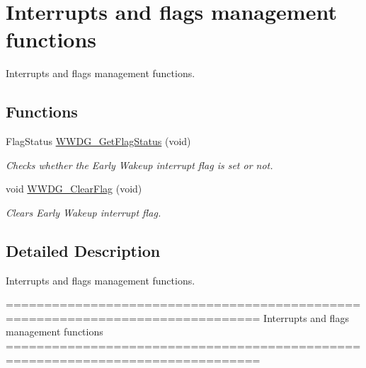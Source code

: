 \hypertarget{group___w_w_d_g___group3}{\section{Interrupts and flags management functions}
\label{group___w_w_d_g___group3}
}


Interrupts and flags management functions.  


\subsection*{Functions}
\begin{DoxyCompactItemize}
\item 
Flag\-Status \hyperlink{group___w_w_d_g___group3_ga7df4882d45918b9b8249dfca1e44fabc}{W\-W\-D\-G\-\_\-\-Get\-Flag\-Status} (void)
\begin{DoxyCompactList}\small\item\em Checks whether the Early Wakeup interrupt flag is set or not. \end{DoxyCompactList}\item 
void \hyperlink{group___w_w_d_g___group3_gabd2b5a6317c2e1a3ab0795838ce59dd2}{W\-W\-D\-G\-\_\-\-Clear\-Flag} (void)
\begin{DoxyCompactList}\small\item\em Clears Early Wakeup interrupt flag. \end{DoxyCompactList}\end{DoxyCompactItemize}


\subsection{Detailed Description}
Interrupts and flags management functions. \begin{DoxyVerb} ===============================================================================
                 Interrupts and flags management functions
 ===============================================================================  \end{DoxyVerb}
 

